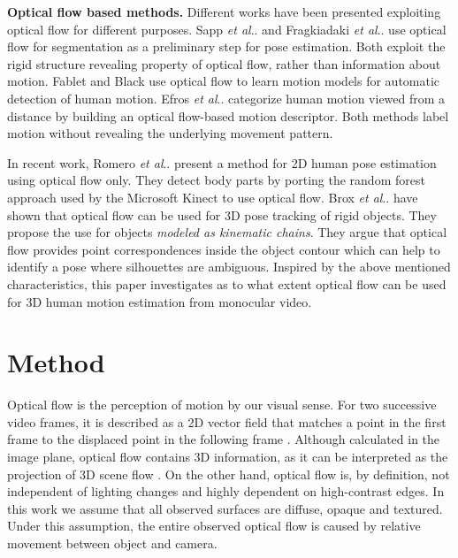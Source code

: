 \documentclass[10pt,twocolumn,letterpaper]{article}
\makeatletter
\DeclareRobustCommand\onedot{\futurelet\@let@token\@onedot}
\def\@onedot{\ifx\@let@token.\else.\null\fi\xspace}
\def\etal{\emph{et al}\onedot}
\makeatother
\begin{document}
\textbf{Optical flow based methods.}
Different works have been presented exploiting optical flow for different purposes. Sapp \etal \cite{sapp2011parsing} and Fragkiadaki \etal \cite{fragkiadaki2013pose} use optical flow for segmentation as a preliminary step for pose estimation. Both exploit the rigid structure revealing property of optical flow, rather than information about motion. Fablet and Black \cite{fablet2002automatic} use optical flow to learn motion models for automatic detection of human motion. Efros \etal \cite{efros2003recognizing} categorize human motion viewed from a distance by building an optical flow-based motion descriptor. Both methods label motion without revealing the underlying movement pattern.


 In recent work, Romero \etal \cite{romero2015flowcap} present a method for 2D human pose estimation using optical flow only. They detect body parts by porting the random forest approach used by the Microsoft Kinect to use optical flow. Brox \etal \cite{brox2006high} have shown that optical flow can be used for 3D pose tracking of rigid objects. They propose the use for objects \emph{modeled as kinematic chains}. They argue that optical flow provides point correspondences inside the object contour which can help to identify a pose where silhouettes are ambiguous. Inspired by the above mentioned characteristics, this paper investigates as to what extent optical flow can be used for 3D human motion estimation from monocular video.
 
 
 \section{Method}
 
 Optical flow \cite{gibson1950perception} is the perception of motion by our visual sense. For two successive video frames, it is described as a 2D vector field that matches a point in the first frame to the displaced point in the following frame \cite{horn1981determining}. %
 Although calculated in the image plane, optical flow contains 3D information, as it can be interpreted as the projection of 3D scene flow \cite{vedula1999three}. On the other hand, optical flow is, by definition, not independent of lighting changes and highly dependent on high-contrast edges. %
 In this work we assume that all observed surfaces are diffuse, opaque and textured. Under this assumption, the entire observed optical flow is caused by relative movement between object and camera.
 
\end{document}
